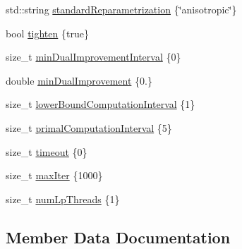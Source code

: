 \begin{DoxyCompactItemize}
std\+::string \hyperlink{structnifty_1_1graph_1_1lifted__multicut_1_1LiftedMulticutMp_1_1Settings_a642a2204e30e3f0d266705c7e338a365}{standard\+Reparametrization} \{\char`\"{}anisotropic\char`\"{}\}
\item 
bool \hyperlink{structnifty_1_1graph_1_1lifted__multicut_1_1LiftedMulticutMp_1_1Settings_a4fead4e331714da86e45c24e2ac28f7a}{tighten} \{true\}
\item 
size\+\_\+t \hyperlink{structnifty_1_1graph_1_1lifted__multicut_1_1LiftedMulticutMp_1_1Settings_a79b9916d2c17197fd3f262bb50cd610f}{min\+Dual\+Improvement\+Interval} \{0\}
\item 
double \hyperlink{structnifty_1_1graph_1_1lifted__multicut_1_1LiftedMulticutMp_1_1Settings_ae2cd3b842653659b06eae8c93f0ea6ff}{min\+Dual\+Improvement} \{0.\}
\item 
size\+\_\+t \hyperlink{structnifty_1_1graph_1_1lifted__multicut_1_1LiftedMulticutMp_1_1Settings_a5d1f3dc8a99297bb9842cd3559ca83c7}{lower\+Bound\+Computation\+Interval} \{1\}
\item 
size\+\_\+t \hyperlink{structnifty_1_1graph_1_1lifted__multicut_1_1LiftedMulticutMp_1_1Settings_a1cea4b59f82a71ee63a6f371d3997f0d}{primal\+Computation\+Interval} \{5\}
\item 
size\+\_\+t \hyperlink{structnifty_1_1graph_1_1lifted__multicut_1_1LiftedMulticutMp_1_1Settings_a38b40facfd4a804b6e7934de1054f610}{timeout} \{0\}
\item 
size\+\_\+t \hyperlink{structnifty_1_1graph_1_1lifted__multicut_1_1LiftedMulticutMp_1_1Settings_ad436364ef24f3159bccd06114e166148}{max\+Iter} \{1000\}
\item 
size\+\_\+t \hyperlink{structnifty_1_1graph_1_1lifted__multicut_1_1LiftedMulticutMp_1_1Settings_ade7b61d6ac54ab6c9917728d83bb78e8}{num\+Lp\+Threads} \{1\}
\end{DoxyCompactItemize}


\subsection{Member Data Documentation}
\hypertarget{structnifty_1_1graph_1_1lifted__multicut_1_1LiftedMulticutMp_1_1Settings_a2dca831d00b942b0ea4696904db0b19e}{}
